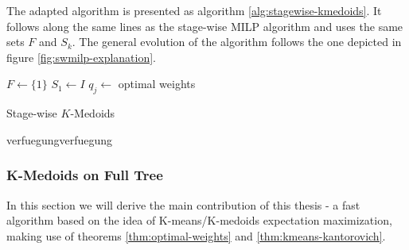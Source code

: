 The adapted algorithm is presented as algorithm \ref{alg:stagewise-kmedoids}.
It follows along the same lines as the stage-wise MILP algorithm and uses the same sets $F$ and $S_k$.
The general evolution of the algorithm follows the one depicted in figure \ref{fig:swmilp-explanation}.
\begin{algorithm}
  $F \leftarrow \{1\}$
  $S_1 \leftarrow I$
  $q_j\leftarrow $ optimal weights 
  \caption{Stage-wise $K$-Medoids}
  \label{alg:stagewise-kmedoids}
verfuegungverfuegung\end{algorithm}
\begin{comment}
\subsubsection{Stochastic Search Solution to Large-Scale MILP}
While the stage-wise methodology is an easy way to reduce the complexity of the problem, it may lead to an oversimplification.
Figure \ref{fig:stagewise-failure} shows an example how stage-wise operating algorithms may yield arbitrarily bad tree approximations. 

The MILP model for the full tree is, however, not computationally tractable.
In this section, we will present an algorithm based on genetic optimization techniques. 

When considering the full stochastic process at once, it is convenient to regard the scenarios as multidimensional events of a random variable. 
Recall from theorem \ref{thm:optimal-weights} that if the values of the nodes of the stochastic process are fixed, the Kantorovich distance o
\todo[inline]{Describe the stochastic search solution}
\todo[inline]{Create an algorithm object for the stochastic search solution}
\end{comment}
%
\subsubsection{K-Medoids on Full Tree}
\label{sec:k-medoids-full}
In this section we will derive the main contribution of this thesis - a fast algorithm based on the idea of K-means/K-medoids expectation maximization, making use of theorems \ref{thm:optimal-weights} and \ref{thm:kmeans-kantorovich}.
%
